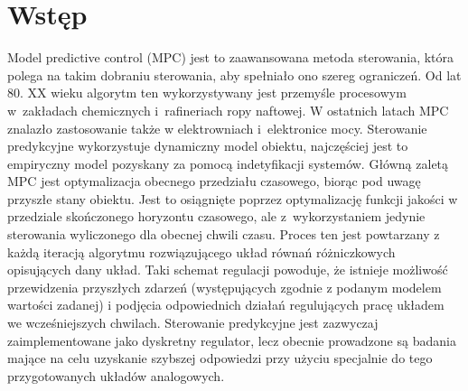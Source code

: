 \section{Wstęp}
Model predictive control (MPC) jest to zaawansowana metoda sterowania, która
polega na takim dobraniu sterowania, aby spełniało ono szereg ograniczeń. Od lat 80. XX wieku
algorytm ten wykorzystywany jest przemyśle procesowym w~zakładach chemicznych i~rafineriach 
ropy naftowej. W ostatnich latach MPC znalazło zastosowanie także w elektrowniach i~elektronice
mocy. Sterowanie predykcyjne wykorzystuje dynamiczny model obiektu, najczęściej jest to empiryczny
model pozyskany za pomocą indetyfikacji systemów. Główną zaletą MPC jest optymalizacja obecnego
przedziału czasowego, biorąc pod uwagę przyszłe stany obiektu. Jest to osiągnięte poprzez
optymalizację funkcji jakości w przedziale skończonego horyzontu czasowego, ale z~wykorzystaniem jedynie sterowania wyliczonego
dla obecnej chwili czasu. Proces ten jest powtarzany z każdą iteracją algorytmu rozwiązującego
układ równań różniczkowych opisujących dany układ. Taki schemat regulacji powoduje, że istnieje
możliwość przewidzenia przyszłych zdarzeń (występujących zgodnie z podanym modelem wartości zadanej)
i podjęcia odpowiednich działań regulujących pracę układem we wcześniejszych chwilach. Sterowanie
predykcyjne jest zazwyczaj zaimplementowane jako dyskretny regulator, lecz obecnie prowadzone są
badania mające na celu uzyskanie szybszej odpowiedzi przy użyciu specjalnie do tego przygotowanych
układów analogowych.

